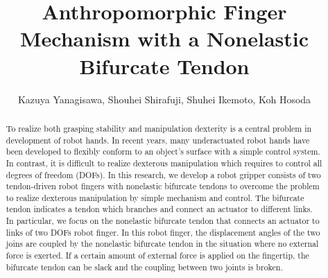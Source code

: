 \documentclass{llncs}
\begin{document}
\title{Anthropomorphic Finger Mechanism with a Nonelastic Bifurcate Tendon}
\author{Kazuya Yanagisawa, Shouhei Shirafuji, Shuhei Ikemoto, Koh Hosoda}
\maketitle

\begin{abstract}
 To realize both grasping stability and manipulation dexterity is a central
 problem in development of robot hands.
 In recent years, many underactuated robot hands have been developed to
 flexibly conform to an object's surface with a simple control system.
 In contrast, it is difficult to realize dexterous manipulation which
 requires to control all degrees of freedom (DOFs).
 In this research, we develop a robot gripper consists of two
 tendon-driven robot fingers with nonelastic bifurcate tendons to
 overcome the problem to realize dexterous manipulation by simple
 mechanism and control.
 The bifurcate tendon indicates a tendon which branches and connect an
 actuator to different links.
 In particular, we focus on the nonelastic bifurcate tendon that
 connects an actuator to links of two DOFs robot finger.
 In this robot finger, the displacement angles of the two joins are
 coupled by the nonelastic bifurcate tendon in the situation where no
 external force is exerted.
 If a certain amount of external force is applied on the fingertip, the
 bifurcate tendon can be slack and the coupling between two joints is
 broken.

\end{abstract}
\end{document}
